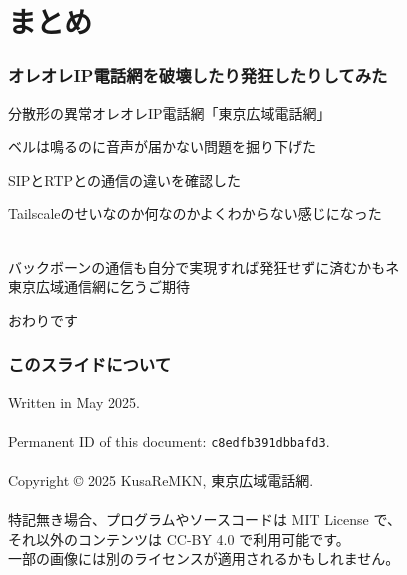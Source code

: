 \documentclass[
  lualatex,
  aspectratio=169,
  14pt
]{beamer}
\begin{document}
\section{まとめ}
\note{ }

\begin{frame}
  \frametitle{オレオレIP電話網を破壊したり発狂したりしてみた}

  分散形の異常オレオレIP電話網「東京広域電話網」

  ベルは鳴るのに音声が届かない問題を掘り下げた

  SIPとRTPとの通信の違いを確認した

  Tailscaleのせいなのか何なのかよくわからない感じになった

  ~\\[-.5\baselineskip]

  バックボーンの通信も自分で実現すれば発狂せずに済むかもネ\\
  \hspace{1.5\zw}東京広域通信網に乞うご期待
\end{frame}

\begin{frame}[standout]
  おわりです
\end{frame}

\begin{frame}
  \frametitle{このスライドについて}

  Written in May 2025.
  \\~\\[-.5\baselineskip]

  Permanent ID of this document: \texttt{c8edfb391dbbafd3}.
  \\~\\[-.5\baselineskip]

  Copyright © 2025 KusaReMKN, 東京広域電話網.
  \\~\\[-.5\baselineskip]

  特記無き場合、プログラムやソースコードは MIT License で、\\
  \hspace{1.5\zw}それ以外のコンテンツは CC-BY 4.0 で利用可能です。\\
  \hspace{1.5\zw}一部の画像には別のライセンスが適用されるかもしれません。
\end{frame}



\appendix
\end{document}
